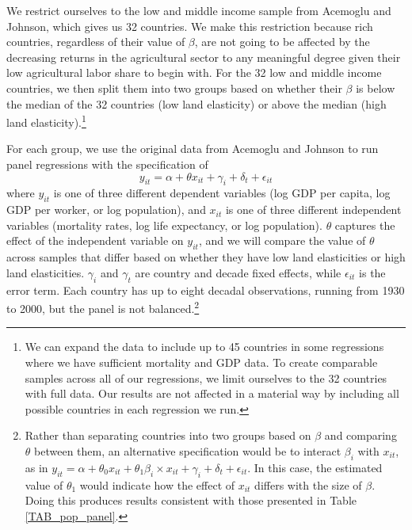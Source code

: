 \documentclass[11pt]{article}
\begin{document}
We restrict ourselves to the low and middle income sample from Acemoglu and Johnson, which gives us 32 countries. We make this restriction because rich countries, regardless of their value of $\beta$, are not going to be affected by the decreasing returns in the agricultural sector to any meaningful degree given their low agricultural labor share to begin with. For the 32 low and middle income countries, we then split them into two groups based on whether their $\beta$ is below the median of the 32 countries (low land elasticity) or above the median (high land elasticity).\footnote{We can expand the data to include up to 45 countries in some regressions where we have sufficient mortality and GDP data. To create comparable samples across all of our regressions, we limit ourselves to the 32 countries with full data. Our results are not affected in a material way by including all possible countries in each regression we run.}

For each group, we use the original data from Acemoglu and Johnson to run panel regressions with the specification of
\begin{equation}
    y_{it} = \alpha + \theta x_{it} + \gamma_i + \delta_t + \epsilon_{it}
\end{equation}
where $y_{it}$ is one of three different dependent variables (log GDP per capita, log GDP per worker, or log population), and $x_{it}$ is one of three different independent variables (mortality rates, log life expectancy, or log population). $\theta$ captures the effect of the independent variable on $y_{it}$, and we will compare the value of $\theta$ across samples that differ based on whether they have low land elasticities or high land elasticities. $\gamma_i$ and $\gamma_t$ are country and decade fixed effects, while $\epsilon_{it}$ is the error term. Each country has up to eight decadal observations, running from 1930 to 2000, but the panel is not balanced.\footnote{Rather than separating countries into two groups based on $\beta$ and comparing $\theta$ between them, an alternative specification would be to interact $\beta_i$ with $x_{it}$, as in $y_{it} = \alpha + \theta_0 x_{it} + \theta_1 \beta_i \times x_{it} + \gamma_i + \delta_t + \epsilon_{it}$. In this case, the estimated value of $\theta_1$ would indicate how the effect of $x_{it}$ differs with the size of $\beta$. Doing this produces results consistent with those presented in Table \ref{TAB_pop_panel}.}
\end{document}
